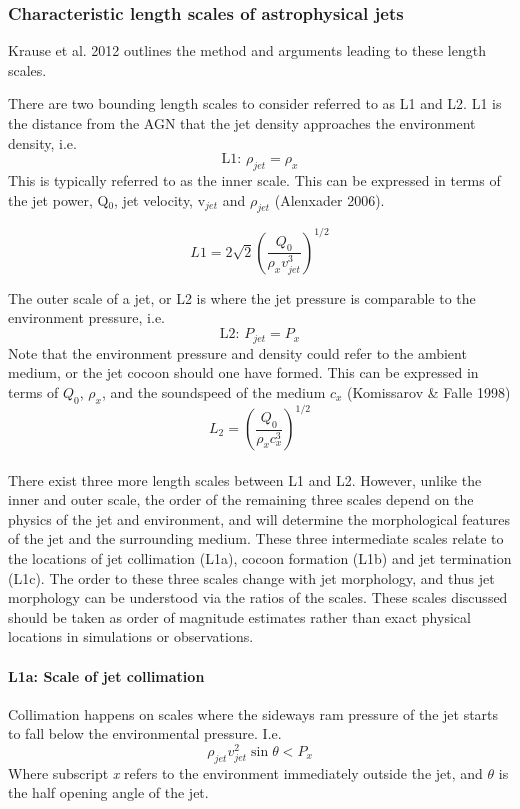 \documentclass[12pt,a4paper]{report}
\begin{document}
\subsubsection{Characteristic length scales of astrophysical jets}

Krause et al. 2012 outlines the method and arguments leading to these length scales.

There are two bounding length scales to consider referred to as L1 and L2. L1 is the distance from the AGN that the jet density approaches the environment density, i.e.
\begin{equation}
\text{L1: }\rho_{jet} = \rho_x
\end{equation}
This is typically referred to as the inner scale. This can be expressed in terms of the jet power, Q$_0$, jet velocity, v$_{jet}$ and $\rho_{jet}$ (Alenxader 2006). 

\begin{equation}
L1 = 2\sqrt{2}\left(\frac{Q_0}{\rho_x v_{jet}^3} \right)^{1/2}
\end{equation}

The outer scale of a jet, or L2 is where the jet pressure is comparable to the environment pressure, i.e.
\begin{equation}
\text{L2: }P_{jet} = P_{x}
\end{equation}
Note that the environment pressure and density could refer to the ambient medium, or the jet cocoon should one have formed. This can be expressed in terms of $Q_0$, $\rho_x$, and the soundspeed of the medium $c_x$ (Komissarov \& Falle 1998)
\begin{equation}
L_2 = \left(\frac{Q_0}{\rho_x c_x^3} \right)^{1/2}
\end{equation}
\\
There exist three more length scales between L1 and L2. However, unlike the inner and outer scale, the order of the remaining three scales depend on the physics of the jet and environment, and will determine the morphological features of the jet and the surrounding medium. These three intermediate scales relate to the locations of jet collimation (L1a), cocoon formation (L1b) and jet termination (L1c). The order to these three scales change with jet morphology, and thus jet morphology can be understood via the ratios of the scales. These scales discussed should be taken as order of magnitude estimates rather than exact physical locations in simulations or observations.

\paragraph{L1a: Scale of jet collimation}
Collimation happens on scales where the sideways ram pressure of the jet starts to fall below the environmental pressure. I.e.
\begin{equation}
\rho_{jet}v_{jet}^{2}\sin{\theta} < P_{x}
\end{equation}
Where subscript \textit{x} refers to the environment immediately outside the jet, and $\theta$ is the half opening angle of the jet.\\
\\
\end{document}
